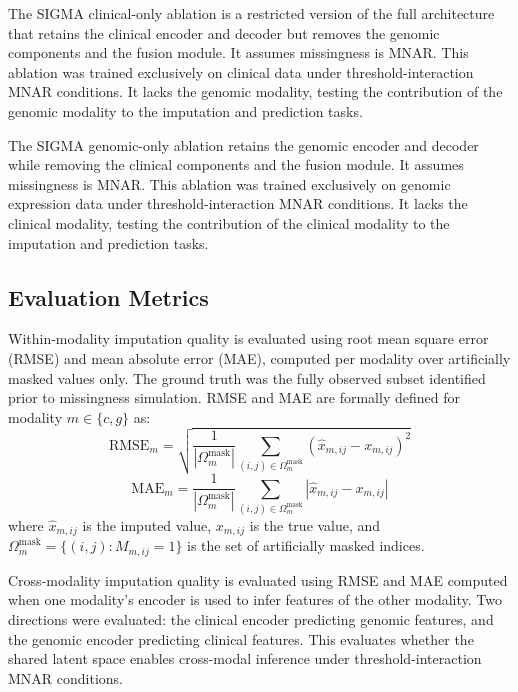 \documentclass[final,3p,times,authoryear]{elsarticle}
\begin{document}
The SIGMA clinical-only ablation is a restricted version of the full architecture that retains the clinical encoder and decoder but removes the genomic components and the fusion module. It assumes missingness is MNAR. This ablation was trained exclusively on clinical data under threshold-interaction MNAR conditions. It lacks the genomic modality, testing the contribution of the genomic modality to the imputation and prediction tasks.

The SIGMA genomic-only ablation retains the genomic encoder and decoder while removing the clinical components and the fusion module. It assumes missingness is MNAR. This ablation was trained exclusively on genomic expression data under threshold-interaction MNAR conditions. It lacks the clinical modality, testing the contribution of the clinical modality to the imputation and prediction tasks.

\subsection{Evaluation Metrics}

Within-modality imputation quality is evaluated using root mean square error (RMSE) and mean absolute error (MAE), computed per modality over artificially masked values only. The ground truth was the fully observed subset identified prior to missingness simulation. RMSE and MAE are formally defined for modality $m \in \{c, g\}$ as:
\begin{equation}
\text{RMSE}_m = \sqrt{\frac{1}{|\Omega_m^{\text{mask}}|} \sum_{(i,j) \in \Omega_m^{\text{mask}}} (\hat{x}_{m,ij} - x_{m,ij})^2}
\label{eq:rmse}
\end{equation}
\begin{equation}
\text{MAE}_m = \frac{1}{|\Omega_m^{\text{mask}}|} \sum_{(i,j) \in \Omega_m^{\text{mask}}} |\hat{x}_{m,ij} - x_{m,ij}|
\label{eq:mae}
\end{equation}
where $\hat{x}_{m,ij}$ is the imputed value, $x_{m,ij}$ is the true value, and $\Omega_m^{\text{mask}} = \{(i,j) : M_{m,ij} = 1\}$ is the set of artificially masked indices.

Cross-modality imputation quality is evaluated using RMSE and MAE computed when one modality's encoder is used to infer features of the other modality. Two directions were evaluated: the clinical encoder predicting genomic features, and the genomic encoder predicting clinical features. This evaluates whether the shared latent space enables cross-modal inference under threshold-interaction MNAR conditions.
\end{document}
